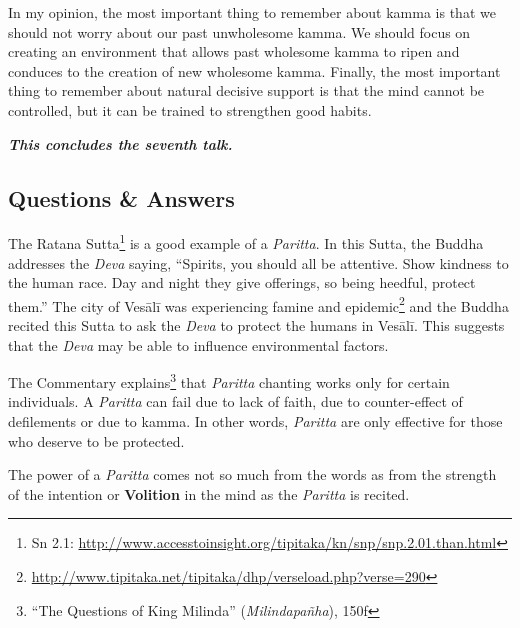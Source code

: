 In my opinion, the most important thing to remember about kamma is that we should not worry about our past unwholesome kamma. We should focus on creating an environment that allows past wholesome kamma to ripen and conduces to the creation of new wholesome kamma. Finally, the most important thing to remember about natural decisive support is that the mind cannot be controlled, but it can be trained to strengthen good habits.

\begin{center}
\textbf{\textit{This concludes the seventh talk.}} \\
\end{center}

\newpage

\subsection*{Questions \& Answers}


The Ratana Sutta\footnote{Sn 2.1: \url{http://www.accesstoinsight.org/tipitaka/kn/snp/snp.2.01.than.html}} is a good example of a \textit{Paritta}. In this Sutta, the Buddha addresses the \textit{Deva} saying, “Spirits, you should all be attentive. Show kindness to the human race. Day and night they give offerings, so being heedful, protect them.” The city of Vesālī was experiencing famine and epidemic\footnote{\url{http://www.tipitaka.net/tipitaka/dhp/verseload.php?verse=290}} and the Buddha recited this Sutta to ask the \textit{Deva} to protect the humans in Vesālī. This suggests that the \textit{Deva} may be able to influence environmental factors.

The Commentary explains\footnote{“The Questions of King Milinda” (\textit{Milindapañha}), 150f} that \textit{Paritta} chanting works only for certain individuals. A \textit{Paritta} can fail due to lack of faith, due to counter-effect of defilements or due to kamma. In other words, \textit{Paritta} are only effective for those who deserve to be protected.

The power of a \textit{Paritta} comes not so much from the words as from the strength of the intention or \textbf{Volition} in the mind as the \textit{Paritta} is recited.


